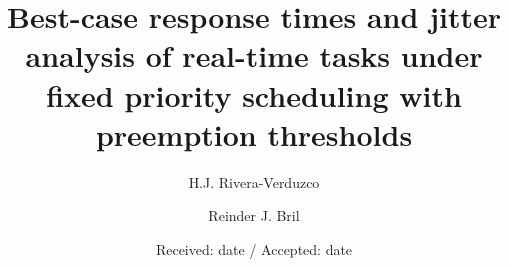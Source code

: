 \newcommand{\aj}    {\mbox{\it AJ}}
\newcommand{\bc}    {\mbox{\it BC}}
\newcommand{\bd}    {\mbox{\it BD}}
\newcommand{\br}    {\mbox{\it BR}}
\newcommand{\bt}    {\mbox{\it BT}}
\newcommand{\hb}    {\mbox{\it HB}}
\newcommand{\hi}    {\mbox{\it HI}}
\newcommand{\ih}    {\mbox{\it IH}}
\newcommand{\wc}    {\mbox{\it WC}}
\newcommand{\wcd}   {\mbox{\it WD}}
\newcommand{\wl}       {\mbox{\it WL}}
\newcommand{\wo}     {\mbox{\it WO}}
\renewcommand{\wr}  {\mbox{\it WR}}
\newcommand{\wt}    {\mbox{\it WT}}
\newcommand{\bu}    {\mbox{\it BU}}
\newcommand{\wh}    {\mbox{\it WH}}
\newcommand{\bh}    {\mbox{\it BH}}
\newcommand{\hlt}    {\mathpzc{H}}

\newcommand\defeq{\stackrel{\mathclap{\tiny\mbox{def}}}{=}}
\DeclarePairedDelimiter{\ceil}{\lceil}{\rceil}




\title{Best-case response times and jitter analysis of real-time tasks under fixed priority scheduling with preemption thresholds%
}


\author{H.J. Rivera-Verduzco         \and
        Reinder J. Bril %
}



\date{Received: date / Accepted: date}


\maketitle

